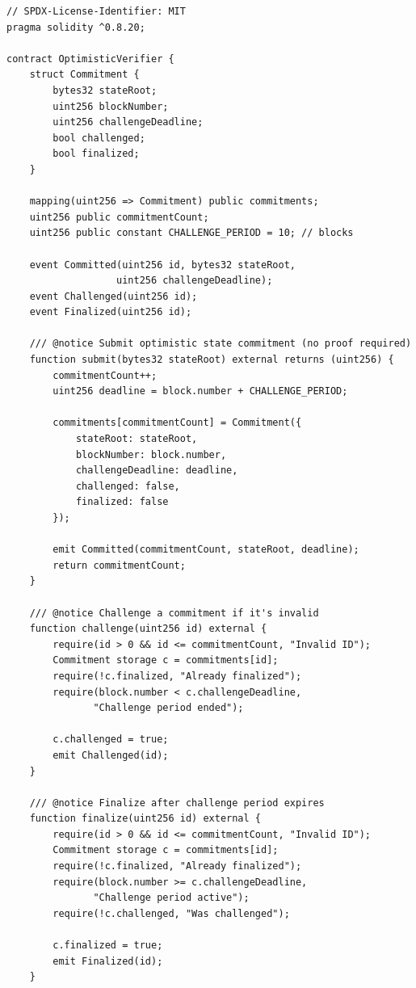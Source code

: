 \begin{listing}[H]
    \begin{verbatim}
// SPDX-License-Identifier: MIT
pragma solidity ^0.8.20;

contract OptimisticVerifier {
    struct Commitment {
        bytes32 stateRoot;
        uint256 blockNumber;
        uint256 challengeDeadline;
        bool challenged;
        bool finalized;
    }

    mapping(uint256 => Commitment) public commitments;
    uint256 public commitmentCount;
    uint256 public constant CHALLENGE_PERIOD = 10; // blocks
    
    event Committed(uint256 id, bytes32 stateRoot, 
                   uint256 challengeDeadline);
    event Challenged(uint256 id);
    event Finalized(uint256 id);

    /// @notice Submit optimistic state commitment (no proof required)
    function submit(bytes32 stateRoot) external returns (uint256) {
        commitmentCount++;
        uint256 deadline = block.number + CHALLENGE_PERIOD;
        
        commitments[commitmentCount] = Commitment({
            stateRoot: stateRoot,
            blockNumber: block.number,
            challengeDeadline: deadline,
            challenged: false,
            finalized: false
        });
        
        emit Committed(commitmentCount, stateRoot, deadline);
        return commitmentCount;
    }

    /// @notice Challenge a commitment if it's invalid
    function challenge(uint256 id) external {
        require(id > 0 && id <= commitmentCount, "Invalid ID");
        Commitment storage c = commitments[id];
        require(!c.finalized, "Already finalized");
        require(block.number < c.challengeDeadline, 
               "Challenge period ended");
        
        c.challenged = true;
        emit Challenged(id);
    }

    /// @notice Finalize after challenge period expires
    function finalize(uint256 id) external {
        require(id > 0 && id <= commitmentCount, "Invalid ID");
        Commitment storage c = commitments[id];
        require(!c.finalized, "Already finalized");
        require(block.number >= c.challengeDeadline, 
               "Challenge period active");
        require(!c.challenged, "Was challenged");
        
        c.finalized = true;
        emit Finalized(id);
    }


\end{verbatim}
\end{listing}
